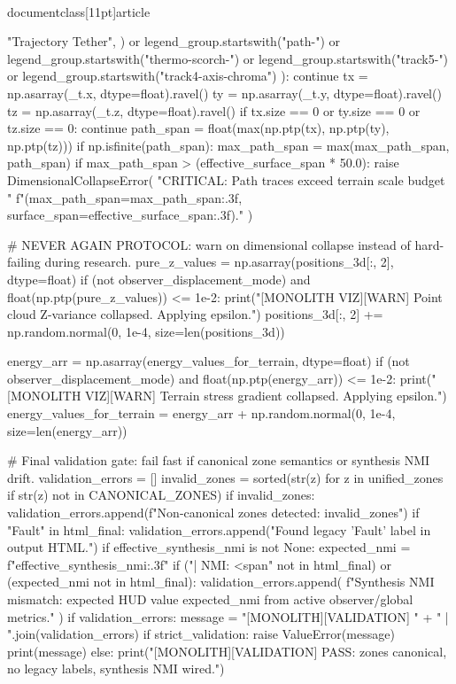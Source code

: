 \\documentclass[11pt]{article}
\begin{document}
\begin{CodeBlock}
{{{{{{{                        "Trajectory Tether",
                    }
                )
                or legend_group.startswith("path-")
                or legend_group.startswith("thermo-scorch-")
                or legend_group.startswith("track5-")
                or legend_group.startswith("track4-axis-chroma")
            ):
                continue
            tx = np.asarray(_t.x, dtype=float).ravel()
            ty = np.asarray(_t.y, dtype=float).ravel()
            tz = np.asarray(_t.z, dtype=float).ravel()
            if tx.size == 0 or ty.size == 0 or tz.size == 0:
                continue
            path_span = float(max(np.ptp(tx), np.ptp(ty), np.ptp(tz)))
            if np.isfinite(path_span):
                max_path_span = max(max_path_span, path_span)
        if max_path_span > (effective_surface_span * 50.0):
            raise DimensionalCollapseError(
                "CRITICAL: Path traces exceed terrain scale budget "
                f"(max_path_span={max_path_span:.3f}, surface_span={effective_surface_span:.3f})."
            )

    # NEVER AGAIN PROTOCOL: warn on dimensional collapse instead of hard-failing during research.
    pure_z_values = np.asarray(positions_3d[:, 2], dtype=float)
    if (not observer_displacement_mode) and float(np.ptp(pure_z_values)) <= 1e-2:
        print("[MONOLITH VIZ][WARN] Point cloud Z-variance collapsed. Applying epsilon.")
        positions_3d[:, 2] += np.random.normal(0, 1e-4, size=len(positions_3d))
        
    energy_arr = np.asarray(energy_values_for_terrain, dtype=float)
    if (not observer_displacement_mode) and float(np.ptp(energy_arr)) <= 1e-2:
        print("[MONOLITH VIZ][WARN] Terrain stress gradient collapsed. Applying epsilon.")
        energy_values_for_terrain = energy_arr + np.random.normal(0, 1e-4, size=len(energy_arr))

    # Final validation gate: fail fast if canonical zone semantics or synthesis NMI drift.
    validation_errors = []
    invalid_zones = sorted({str(z) for z in unified_zones if str(z) not in CANONICAL_ZONES})
    if invalid_zones:
        validation_errors.append(f"Non-canonical zones detected: {invalid_zones}")
    if "Fault" in html_final:
        validation_errors.append("Found legacy 'Fault' label in output HTML.")
    if effective_synthesis_nmi is not None:
        expected_nmi = f"{effective_synthesis_nmi:.3f}"
        if ("| NMI: <span" not in html_final) or (expected_nmi not in html_final):
            validation_errors.append(
                f"Synthesis NMI mismatch: expected HUD value {expected_nmi} from active observer/global metrics."
            )
    if validation_errors:
        message = "[MONOLITH][VALIDATION] " + " | ".join(validation_errors)
        if strict_validation:
            raise ValueError(message)
        print(message)
    else:
        print("[MONOLITH][VALIDATION] PASS: zones canonical, no legacy labels, synthesis NMI wired.")

}}}}}}
\end{CodeBlock}
\end{document}
